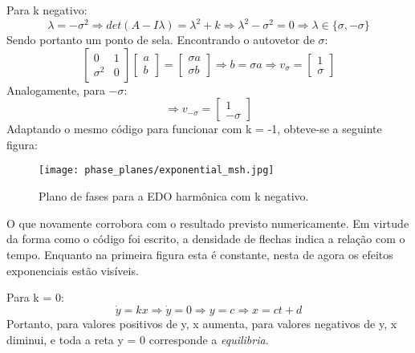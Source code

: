 \documentclass{article}[twocolumn]
\begin{document}
	Para k negativo:
	\begin{equation}
		\lambda = -\sigma^2 \Rightarrow det(A - I\lambda) = \lambda^2 + k \Rightarrow
		\lambda^2 - \sigma^2 = 0 \Rightarrow \lambda \in \{\sigma, -\sigma\}
		\nonumber
	\end{equation}
	Sendo portanto um ponto de sela. Encontrando o autovetor de $\sigma$:
	\begin{equation}
		\left[\begin{array}{cc}
			0 & 1\\
			\sigma^2 & 0
		\end{array}\right] \left[\begin{array}{c}
			a\\
			b
		\end{array}\right] = \left[\begin{array}{c}
			\sigma a\\
			\sigma b
		\end{array}\right] \Rightarrow
		b = \sigma a \Rightarrow v_{\sigma} = \left[\begin{array}{c}
			1\\
			\sigma
		\end{array}\right]
		\nonumber
	\end{equation}
	Analogamente, para $-\sigma$:
	\begin{equation}
		\Rightarrow v_{-\sigma} = \left[\begin{array}{c}
			1\\
			-\sigma
		\end{array}\right]
		\nonumber
	\end{equation}
	Adaptando o mesmo c\'odigo para funcionar com k = -1, obteve-se a seguinte figura:
	\begin{figure}[H]
		\centering
		\texttt{[image: phase\_planes/exponential\_msh.jpg]}
		\caption{Plano de fases para a EDO harm\^onica com k negativo.}
	\end{figure}
	O que novamente corrobora com o resultado previsto numericamente. Em virtude da forma
	como o c\'odigo foi escrito, a densidade de flechas indica a rela\c{c}\~ao com o tempo.
	Enquanto na primeira figura esta \'e constante, nesta de agora os efeitos exponenciais
	est\~ao vis\'iveis.
	
	Para k = 0:
	\begin{equation}
		\dot{y} = kx \Rightarrow \dot{y} = 0 \Rightarrow y = c \Rightarrow x = ct + d
		\nonumber
	\end{equation}
	Portanto, para valores positivos de y, x aumenta, para valores negativos de y, x
	diminui, e toda a reta y = 0 corresponde a \textit{equilibria}.
\end{document}
